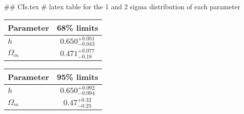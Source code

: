 ## CIs.tex
# latex table for the 1 and 2 sigma distribution of each parameter

\begin{tabular} { l  c}
 Parameter &  68\% limits\\
\hline
{\boldmath$h              $} & $0.650^{+0.051}_{-0.043}   $\\
{\boldmath$\Omega_m       $} & $0.471^{+0.077}_{-0.18}    $\\
\hline
\end{tabular}

\begin{tabular} { l  c}
 Parameter &  95\% limits\\
\hline
{\boldmath$h              $} & $0.650^{+0.092}_{-0.094}   $\\
{\boldmath$\Omega_m       $} & $0.47^{+0.32}_{-0.25}      $\\
\hline
\end{tabular}

